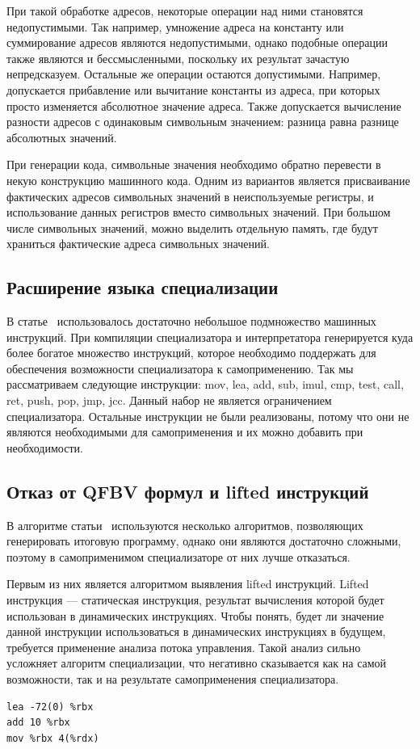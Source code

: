 При такой обработке адресов, некоторые операции над ними становятся недопустимыми.
Так например, умножение адреса на константу или суммирование адресов являются недопустимыми,
однако подобные операции также являются и бессмысленными, поскольку их результат зачастую непредсказуем.
Остальные же операции остаются допустимыми.
Например, допускается прибавление или вычитание константы из адреса,
при которых просто изменяется абсолютное значение адреса.
Также допускается вычисление разности адресов с одинаковым символьным значением:
разница равна разнице абсолютных значений.

При генерации кода, символьные значения необходимо обратно перевести в некую конструкцию машинного кода.
Одним из вариантов является присваивание фактических адресов символьных значений в неиспользуемые регистры,
и использование данных регистров вместо символьных значений.
При большом числе символьных значений, можно выделить отдельную память,
где будут храниться фактические адреса символьных значений.


\subsection{Расширение языка специализации}
\label{part:4.4}
В статье~\cite{PEMC} использовалось достаточно небольшое подмножество машинных инструкций.
При компиляции специализатора и интерпретатора генерируется куда более богатое множество инструкций,
которое необходимо поддержать для обеспечения возможности специализатора к самоприменению.
Так мы рассматриваем следующие инструкции: \textsf{mov, lea, add, sub, imul, cmp, test, call, ret, push, pop, jmp, jcc}.
Данный набор не является ограничением специализатора.
Остальные инструкции не были реализованы, потому что они не являются необходимыми для самоприменения и
их можно добавить при необходимости.


\subsection{Отказ от QFBV формул и lifted инструкций}
\label{part:4.5}

В алгоритме статьи~\cite{PEMC} используются несколько алгоритмов, позволяющих генерировать итоговую программу,
однако они являются достаточно сложными, поэтому в самоприменимом специализаторе от них лучше отказаться. 

Первым из них является алгоритмом выявления lifted инструкций. Lifted инструкция --- статическая инструкция, результат вычисления которой будет использован в динамических инструкциях. Чтобы понять, будет ли значение данной инструкции использоваться в динамических инструкциях в будущем, требуется применение анализа потока управления. Такой анализ сильно усложняет алгоритм специализации, что негативно сказывается как на самой возможности, так и на результате самоприменения
специализатора.
\newsavebox\boxfour
\begin{lrbox}{\boxfour}
\begin{lstlisting}[xleftmargin = 20pt]
lea -72(0) %rbx
add 10 %rbx
mov %rbx 4(%rdx)
\end{lstlisting}
\end{lrbox}

